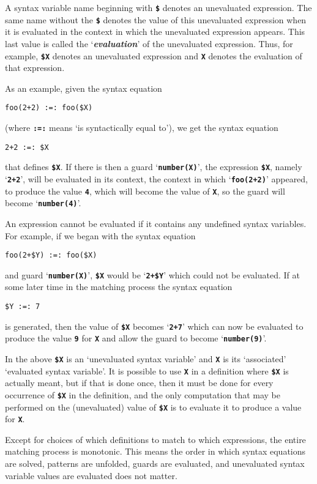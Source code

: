 \documentclass[12pt]{article}
\makeatletter
\newcommand{\TT}[1]{{\tt \bfseries #1}}
\newcommand{\key}[1]{{\bf \em #1}\index{#1}}
\newcommand{\ttmkey}[2]{\TT{#1}\index{#1@{\tt #1}!#2}}
\makeatother
\begin{document}
A syntax variable name beginning with
\ttmkey{\$}{in syntax variable name} denotes an unevaluated
expression.  The same name without the \TT{\$} denotes the value
of this unevaluated expression when it is evaluated
in the context in which the unevaluated expression appears.
This last value is called the `\key{evaluation}' of the unevaluated
expression.  Thus, for example, \TT{\$X} denotes an unevaluated
expression and \TT{X} denotes the evaluation of that expression.

As an example, given the syntax equation
\begin{center}
\verb|foo(2+2) :=: foo($X)|
\end{center}
(where \TT{:=:} means `is syntactically equal to'), we get
the syntax equation
\begin{center}
\verb|2+2 :=: $X|
\end{center}
that defines \TT{\$X}.  If there is then a guard `\TT{number(X)}',
the expression \TT{\$X}, namely `\TT{2+2}',
will be evaluated in its context, the context in which `\TT{foo(2+2)}'
appeared, to produce the value \TT{4}, which will become the value of
\TT{X}, so the guard will become `\TT{number(4)}'.

An expression cannot be evaluated if it contains any undefined syntax
variables.  For example, if we began with the syntax equation
\begin{center}
\verb|foo(2+$Y) :=: foo($X)|
\end{center}
and guard `\TT{number(X)}', \TT{\$X} would be `\TT{2+\$Y}' which
could not be evaluated.  If at some later time in the matching process
the syntax equation
\begin{center}
\verb|$Y :=: 7|
\end{center}
is generated, then the value of \TT{\$X} becomes `\TT{2+7}'
which can now be evaluated to produce the value \TT{9} for \TT{X}
and allow the guard to become `\TT{number(9)}'.

In the above \TT{\$X} is an `unevaluated syntax variable' and
\TT{X} is its `associated' `evaluated syntax variable'.  It is
possible to use \TT{X} in a definition where \TT{\$X} is actually
meant, but if that is done once, then it must be done for every occurrence
of \TT{\$X} in the definition, and the only computation that may be
performed on the (unevaluated) value of \TT{\$X} is to evaluate it to
produce a value for \TT{X}.

Except for choices of which definitions to match to which expressions,
the entire matching process is monotonic.  This means the order in which
syntax equations are solved, patterns are unfolded, guards are evaluated,
and unevaluated syntax variable values are evaluated does not matter.
\end{document}

